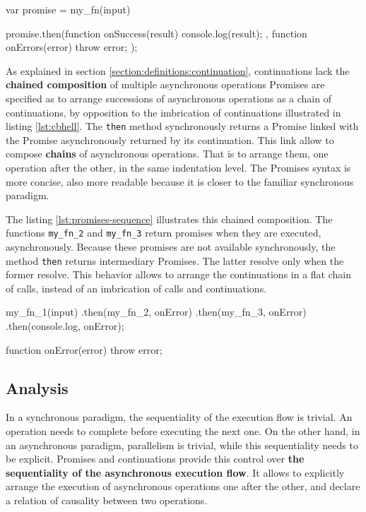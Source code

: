 \begin{code}[js, %
             caption={Example of a promise}, %
             label={lst:then}] %
var promise = my_fn(input)

promise.then(function onSuccess(result) {
  console.log(result);
}, function onErrors(error) {
  throw error;
});
\end{code}

As explained in section \ref{section:definitions:continuation}, continuations lack the \textbf{chained composition} of multiple asynchronous operations
Promises are specified as to arrange successions of asynchronous operations as a chain of continuations, by opposition to the imbrication of continuations illustrated in listing \ref{lst:cbhell}.
The \texttt{then} method synchronously returns a Promise linked with the Promise asynchronously returned by its continuation.
This link allow to compose \textbf{chains} of asynchronous operations.
That is to arrange them, one operation after the other, in the same indentation level.
The Promises syntax is more concise, also more readable because it is closer to the familiar synchronous paradigm.

The listing \ref{lst:promises-sequence} illustrates this chained composition.
The functions \texttt{my_fn_2} and \texttt{my_fn_3} return promises when they are executed, asynchronously.
Because these promises are not available synchronously, the method \texttt{then} returns intermediary Promises.
The latter resolve only when the former resolve.
This behavior allows to arrange the continuations in a flat chain of calls, instead of an imbrication of calls and continuations.

\begin{code}[js, %
             caption={The chain of Promises is more concise than an imbrication of callbacks}, %
             label={lst:promises-sequence}] %
my_fn_1(input)
.then(my_fn_2, onError)
.then(my_fn_3, onError)
.then(console.log, onError);

function onError(error) {
  throw error;
}
\end{code}

\subsection{Analysis} \label{seciton:definitions:analysis}

In a synchronous paradigm, the sequentiality of the execution flow is trivial.
An operation needs to complete before executing the next one.
On the other hand, in an asynchronous paradigm, parallelism is trivial, while this sequentiality needs to be explicit.
Promises and continuations provide this control over \textbf{the sequentiality of the asynchronous execution flow}.
It allows to explicitly arrange the execution of asynchronous operations one after the other, and declare a relation of causality between two operations.

